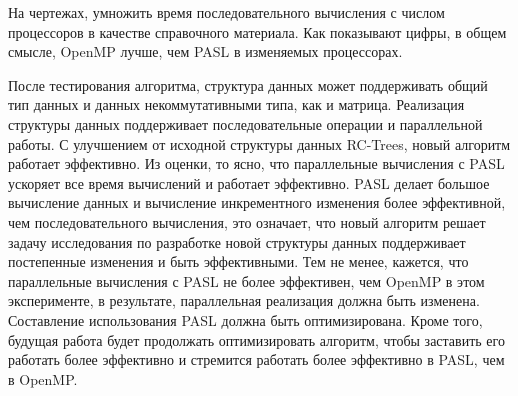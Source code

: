 \documentclass[specification,annotation]{itmo-student-thesis}
\newcommand{\revise}[1]{{\color{red!70!black} #1 }}
\begin{document}
\revise{
На чертежах, умножить время последовательного вычисления с числом процессоров в качестве справочного материала. Как показывают цифры, в общем смысле, OpenMP лучше, чем PASL в изменяемых процессорах.
}

\chapterconclusion

\startconclusionpage

\revise{
После тестирования алгоритма, структура данных может поддерживать общий тип данных и данных некоммутативными типа, как и матрица. Реализация структуры данных поддерживает последовательные операции и 
параллельной работы. С улучшением от исходной структуры данных RC-Trees, новый алгоритм работает эффективно. Из оценки, то ясно, что параллельные вычисления с PASL ускоряет все время вычислений и работает 
эффективно. PASL делает большое вычисление данных и вычисление инкрементного изменения более эффективной, чем последовательного вычисления, это означает, что новый алгоритм решает задачу исследования по 
разработке новой структуры данных поддерживает постепенные изменения и быть эффективными. Тем не менее, кажется, что параллельные вычисления с PASL не более эффективен, чем OpenMP в этом эксперименте, в 
результате, параллельная реализация должна быть изменена. Составление использования PASL должна быть оптимизирована. Кроме того, будущая работа будет продолжать оптимизировать алгоритм, чтобы заставить 
его работать более эффективно и стремится работать более эффективно в PASL, чем в OpenMP.
}

\printmainbibliography
\end{document}
